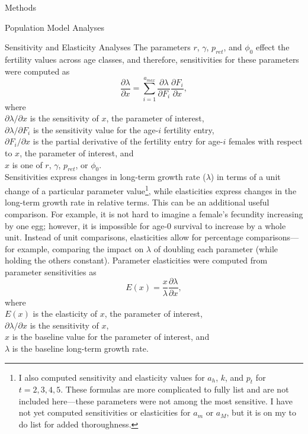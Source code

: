 \documentclass[12pt]{article}
\begin{document}
\begin{section}{Methods}
\begin{subsection}{Population Model Analyses}
\begin{subsubsection}{Sensitivity and Elasticity Analyses}
The parameters $r$, $\gamma$, $p_{ret}$, and $\phi_0$ effect the fertility values across age classes, and therefore, sensitivities for these parameters were computed as
\begin{equation}
\frac{\partial\lambda}{\partial x}=\sum_{i=1}^{a_{max}}\frac{\partial\lambda}{\partial F_i}\frac{\partial F_i}{\partial x},
\end{equation} 
where\\
\hspace*{0.5cm}$\partial\lambda/\partial x$ is the sensitivity of $x$, the parameter of interest,\\
\hspace*{0.5cm}$\partial\lambda/\partial F_i$ is the sensitivity value for the age-$i$ fertility entry,\\
\hspace*{0.5cm}$\partial F_i/\partial x$ is the partial derivative of the fertility entry for age-$i$ females with respect to $x$, 
\hspace*{1.5cm}the parameter of interest, and\\
\hspace*{0.5cm}$x$ is one of $r$, $\gamma$, $p_{ret}$, or $\phi_0$.\\

Sensitivities express changes in long-term growth rate ($\lambda$) in terms of a unit change of a particular parameter value\footnote{I also computed sensitivity and elasticity values for $a_h$, $k$, and $p_t$ for $t=2,3,4,5$.  These formulas are more complicated to fully list and are not included here---these parameters were not among the most sensitive.  I have not yet computed sensitivities or elasticities for $a_m$ or $a_M$, but it is on my to do list for added thoroughness.}, while elasticities express changes in the long-term growth rate in relative terms.  This can be an additional useful comparison.  For example, it is not hard to imagine a female's fecundity increasing by one egg; however, it is impossible for age-0 survival to increase by a whole unit.  Instead of unit comparisons, elasticities allow for percentage comparisons---for example, comparing the impact on $\lambda$ of doubling each parameter (while holding the others constant). Parameter elasticities were computed from parameter sensitivities as
\begin{equation}
E(x)=\frac{x}{\lambda}\frac{\partial\lambda}{\partial x},
\end{equation} 
where\\
\hspace*{0.5cm}$E(x)$ is the elasticity of $x$, the parameter of interest,\\
\hspace*{0.5cm}$\partial\lambda/\partial x$ is the sensitivity of $x$,\\
\hspace*{0.5cm}$x$ is the baseline value for the parameter of interest, and\\
\hspace*{0.5cm}$\lambda$ is the baseline long-term growth rate. 
\end{subsubsection}


\end{subsection}
\end{section}
\end{document}
